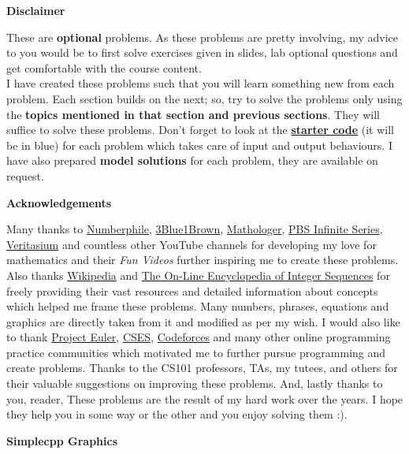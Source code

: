 \begin{center}
	\textbf{\large{Disclaimer}}
\end{center}
These are \textbf{optional} problems.
As these problems are pretty involving, my advice to you would be to first solve exercises given in slides, lab optional questions and get comfortable with the course content.\\
I have created these problems such that you will learn something new from each problem. Each section builds on the next; so, try to solve the problems only using the \textbf{topics mentioned in that section and previous sections}. They will suffice to solve these problems. Don't forget to look at the \href{https://github.com/paramrathour/CS-101/tree/main/Starter%20Codes}{\textbf{starter code}} (it will be in blue) for each problem which takes care of input and output behaviours. I have also prepared \textbf{model solutions} for each problem, they are available on request.
\begin{center}
	\textbf{\large{Acknowledgements}}
\end{center}
Many thanks to \href{https://www.youtube.com/user/numberphile}{Numberphile}, \href{https://www.youtube.com/channel/UCYO_jab_esuFRV4b17AJtAw}{3Blue1Brown}, \href{https://www.youtube.com/channel/UC1_uAIS3r8Vu6JjXWvastJg}{Mathologer}, \href{https://www.youtube.com/channel/UCs4aHmggTfFrpkPcWSaBN9g}{PBS Infinite Series}, \href{https://www.youtube.com/user/1veritasium}{Veritasium} and countless other YouTube channels for developing my love for mathematics and their \emph{Fun Videos} further inspiring me to create these problems. Also thanks \href{https://en.wikipedia.org/wiki/Main_Page}{Wikipedia} and \href{http://oeis.org/}{The On-Line Encyclopedia of Integer Sequences} for freely providing their vast resources and detailed information about concepts which helped me frame these problems. Many numbers, phrases, equations and graphics are directly taken from it and modified as per my wish. I would also like to thank \href{https://projecteuler.net/}{Project Euler}, \href{https://cses.fi/problemset}{CSES}, \href{https://codeforces.com/}{Codeforces} and many other online programming practice communities which motivated me to further pursue programming and create problems. Thanks to the CS101 professors, TAs, my tutees, and others for their valuable suggestions on improving these problems. And, lastly thanks to you, reader, These problems are the result of my hard work over the years. I hope they help you in some way or the other and you enjoy solving them :).
\begin{center}
	\textbf{\large{Simplecpp Graphics}}
\end{center}
